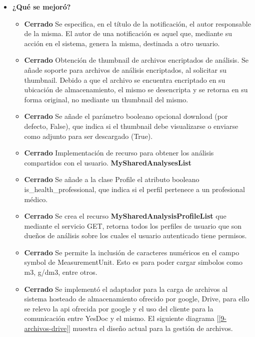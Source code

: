 \begin{itemize}
   		\item \textbf{¿Qué se mejoró?}
        	\begin{itemize}
                \item \textbf{Cerrado} Se especifica, en el título de la notificación, el autor responsable de la misma.  El autor de una notificación es aquel que, mediante su acción en el sistema, genera la misma, destinada a otro usuario.
                \item \textbf{Cerrado} Obtención de thumbnail de archivos encriptados de análisis. Se añade soporte para archivos de análisis encriptados, al solicitar su thumbnail. Debido a que el archivo se encuentra encriptado en su ubicación de almacenamiento, el mismo se desencripta y se retorna en su forma original, no mediante un thumbnail del mismo.
                \item \textbf{Cerrado} Se añade el parámetro booleano opcional download (por defecto, False), que indica si el thumbnail debe visualizarse o enviarse como adjunto para ser descargado (True).
                \item \textbf{Cerrado} Implementación de recurso para obtener los análisis compartidos con el usuario. \textbf{MySharedAnalysesList}
                \item \textbf{Cerrado} Se añade a la clase Profile el atributo booleano is\_health\_professional, que indica si el perfil pertenece a un profesional médico.
                \item \textbf{Cerrado} Se crea el recurso \textbf{MySharedAnalysisProfileList} que mediante el servicio GET, retorna todos los perfiles de usuario que son dueños de análisis sobre los cuales el usuario autenticado tiene permisos. 
                \item \textbf{Cerrado} Se permite la inclusión de caracteres numéricos en el campo symbol de MeasurementUnit. Esto es para poder cargar simbolos como m3, g/dm3, entre otros.
                \item \textbf{Cerrado} Se implementó el adaptador para la carga de archivos al sistema hosteado de almacenamiento ofrecido por google, Drive, para ello se relevo la api ofrecida por google y el uso del cliente para la comunicación entre YesDoc y el mismo. El siguiente diagrama [\ref{9-archivos-drive}] muestra el diseño actual para la gestión de archivos.   
			\end{itemize}
			

\end{itemize}
